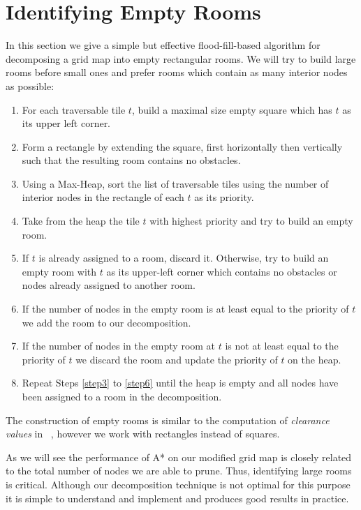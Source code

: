 \section{Identifying Empty Rooms}
\label{empty rooms}
In this section we give a simple but effective flood-fill-based algorithm for decomposing a 
grid map into empty rectangular rooms.
We will try to build large rooms before small ones and prefer rooms which
contain as many interior nodes as possible:

\begin{enumerate}
\item{For each traversable tile $t$, build a maximal size empty square which has
$t$ as its upper left corner.}
\item{Form a rectangle by extending the square, first horizontally then
vertically such that the resulting room contains no obstacles. }
\item{\label{step2} Using a Max-Heap, sort the list of traversable tiles using the number of
interior nodes in the rectangle of each $t$ as its priority.}
\item{\label{step3} Take from the heap the tile $t$ with highest priority and try to build an empty
room. }
\item{\label{step4} If $t$ is already assigned to a room, discard it. 
Otherwise, try to build an empty room with $t$ as its upper-left corner which
contains no obstacles or nodes already assigned to another room.}
\item{\label{step5} If the number of nodes in the empty room is at least equal to the priority 
of $t$ we add the room to our decomposition. }
\item{\label{step6} If the number of nodes in the empty room at $t$ is not at least equal to
the priority of $t$ we discard the room and update the priority of $t$ on the heap.}
\item{\label{step7} Repeat Steps \ref{step3} to \ref{step6} until the heap is
empty and all nodes have been assigned to a room in the decomposition.}
\end{enumerate}

The construction of empty rooms is similar to the computation of \emph{clearance
values} in \citeauthor{harabor08}~, however we work with rectangles
instead of squares. 
\par
As we will see the performance of A* on our modified grid map is closely related to the total 
number of nodes we are able to prune.
Thus, identifying large rooms is critical.
Although our decomposition technique is not optimal for this purpose it is simple
to understand and implement and produces good results in practice.
